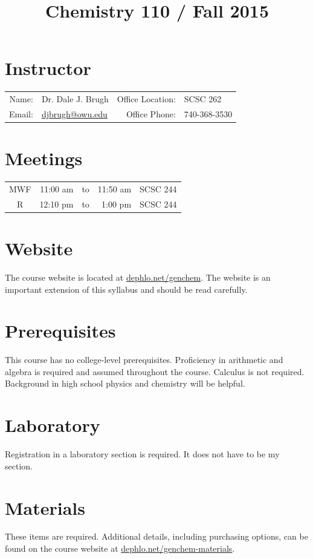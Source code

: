 \documentclass[letterpaper,oneside,onecolumn,11pt,article]{memoir}
\title{Chemistry 110 / Fall 2015}
\date{}
\author{}
\begin{document}
\maketitle
\thispagestyle{courseinformationtitle}

\section{Instructor}
\begin{tabular}{rl|rl}
Name: & Dr. Dale J. Brugh & Office Location: & SCSC 262 \\
Email: & \href{mailto:djbrugh@owu.edu}{djbrugh@owu.edu} & Office Phone: & 740-368-3530 \\
\end{tabular}

\section{Meetings}
\begin{tabular}{crcrl}
MWF & 11:00 am & to & 11:50 am & SCSC 244 \\
R & 12:10 pm & to & 1:00 pm & SCSC 244
\end{tabular}

\section{Website}
The course website is located at \href{http://dephlo.net/genchem}{dephlo.net/genchem}. The website is an important extension of this syllabus and should be read carefully. 

\section{Prerequisites}
This course has no college-level prerequisites. Proficiency in arithmetic and algebra is required and assumed throughout the course. Calculus is not required. Background in high school physics and chemistry will be helpful. 

\section{Laboratory}
Registration in a laboratory section is required. It does not have to be my section. 

\section{Materials}
These items are required. Additional details, including purchasing options, can be found on the course website at \href{http://dephlo.net/genchem-materials}{dephlo.net/genchem-materials}.
\end{document}
